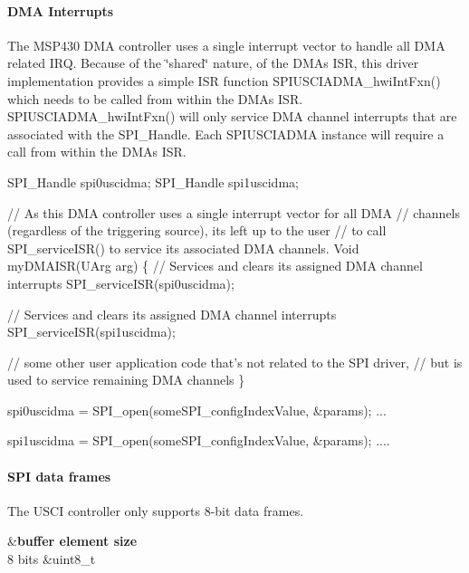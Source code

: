 \paragraph*{D\+M\+A Interrupts}

The M\+S\+P430 D\+M\+A controller uses a single interrupt vector to handle all D\+M\+A related I\+R\+Q. Because of the \char`\"{}shared\char`\"{} nature, of the D\+M\+A\textquotesingle{}s I\+S\+R, this driver implementation provides a simple I\+S\+R function S\+P\+I\+U\+S\+C\+I\+A\+D\+M\+A\+\_\+hwi\+Int\+Fxn() which needs to be called from within the D\+M\+A\textquotesingle{}s I\+S\+R. S\+P\+I\+U\+S\+C\+I\+A\+D\+M\+A\+\_\+hwi\+Int\+Fxn() will only service D\+M\+A channel interrupts that are associated with the S\+P\+I\+\_\+\+Handle. Each S\+P\+I\+U\+S\+C\+I\+A\+D\+M\+A instance will require a call from within the D\+M\+A\textquotesingle{}s I\+S\+R.


\begin{DoxyCode}
SPI_Handle spi0uscidma;
SPI_Handle spi1uscidma;

\textcolor{comment}{// As this DMA controller uses a single interrupt vector for all DMA}
\textcolor{comment}{// channels (regardless of the triggering source), its left up to the user}
\textcolor{comment}{// to call SPI\_serviceISR() to service its associated DMA channels.}
Void myDMAISR(UArg arg)
\{
    \textcolor{comment}{// Services and clears its assigned DMA channel interrupts}
    SPI_serviceISR(spi0uscidma);

    \textcolor{comment}{// Services and clears its assigned DMA channel interrupts}
    SPI_serviceISR(spi1uscidma);

    \textcolor{comment}{// some other user application code that's not related to the SPI driver,}
    \textcolor{comment}{// but is used to service remaining DMA channels}
\}

spi0uscidma = SPI_open(someSPI\_configIndexValue, &params);
...

spi1uscidma = SPI_open(someSPI\_configIndexValue, &params);
....
\end{DoxyCode}


\paragraph*{S\+P\+I data frames}

The U\+S\+C\+I controller only supports 8-\/bit data frames.

\begin{TabularC}{2}
\hline
{}&{\bf buffer element size  }\\
8 bits &uint8\+\_\+t \\
\end{TabularC}
